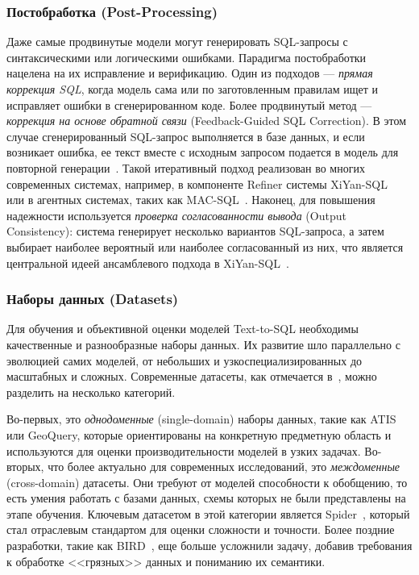 \subsubsection{Постобработка (Post-Processing)}

Даже самые продвинутые модели могут генерировать
SQL-запросы с синтаксическими или логическими ошибками. Парадигма постобработки нацелена на
их исправление и верификацию. Один из подходов --- \textit{прямая коррекция SQL}, когда
модель сама или по заготовленным правилам ищет и исправляет ошибки в сгенерированном коде.
Более продвинутый метод --- \textit{коррекция на основе обратной связи}
(Feedback-Guided SQL Correction). В этом случае сгенерированный SQL-запрос выполняется в
базе данных, и если возникает ошибка, ее текст вместе с исходным запросом подается в модель
для повторной генерации~\cite{huangExploringLandscapeTexttoSQL2025}. Такой итеративный
подход реализован во многих современных системах, например, в компоненте Refiner системы
XiYan-SQL~\cite{gaoPreviewXiYanSQLMultiGenerator2025} или в агентных системах, таких как
MAC-SQL~\cite{zhuLargeLanguageModel2024}. Наконец, для повышения надежности используется
\textit{проверка согласованности вывода} (Output Consistency): система генерирует несколько
вариантов SQL-запроса, а затем выбирает наиболее вероятный или наиболее согласованный из них,
что является центральной идеей ансамблевого подхода в
XiYan-SQL~\cite{gaoPreviewXiYanSQLMultiGenerator2025, huangExploringLandscapeTexttoSQL2025}.

\subsubsection{Наборы данных (Datasets)}

Для обучения и объективной оценки моделей Text-to-SQL
необходимы качественные и разнообразные наборы данных.
Их развитие шло параллельно с эволюцией самих моделей,
от небольших и узкоспециализированных до масштабных и сложных.
Современные датасеты, как отмечается в~\cite{huangExploringLandscapeTexttoSQL2025},
можно разделить на несколько категорий.

Во-первых, это \textit{однодоменные} (single-domain) наборы данных,
такие как ATIS или GeoQuery, которые ориентированы на конкретную предметную
область и используются для оценки производительности моделей в узких задачах.
Во-вторых, что более актуально для
современных исследований, это \textit{междоменные} (cross-domain) датасеты.
Они требуют от моделей способности к обобщению, то есть умения работать с базами данных,
схемы которых не были представлены на этапе обучения. Ключевым датасетом в этой категории
является Spider~\cite{kimNaturalLanguageSQL2020, visperasModernTexttoSQLSemantic2023},
который стал отраслевым стандартом для оценки сложности и точности. Более поздние разработки,
такие как BIRD~\cite{huangExploringLandscapeTexttoSQL2025}, еще больше усложнили задачу,
добавив требования к обработке <<грязных>> данных и пониманию их семантики.

